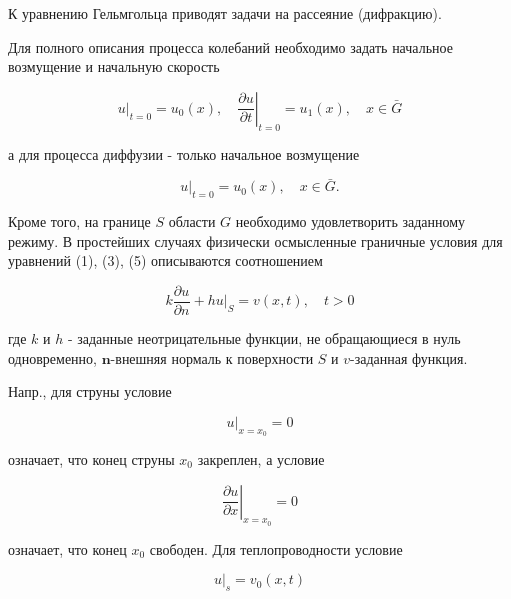 \documentclass[10pt]{article}
\begin{document}
К уравнению Гельмгольца приводят задачи на рассеяние (дифракцию).



Для полного описания процесса колебаний необходимо задать начальное возмущение и начальную скорость



\[

\left.u\right|_{t=0}=u_{0}(x),\left.\quad \frac{\partial u}{\partial t}\right|_{t=0}=u_{1}(x), \quad x \in \bar{G}

\]



а для процесса диффузии - только начальное возмущение



\[

\left.u\right|_{t=0}=u_{0}(x), \quad x \in \bar{G} .

\]



Кроме того, на границе $S$ области $G$ необходимо удовлетворить заданному режиму. В простейших случаях физически осмысленные граничные условия для уравнений (1), (3), (5) описываются соотношением



\[

k \frac{\partial u}{\partial n}+\left.h u\right|_{S}=v(x, t), \quad t>0

\]



где $k$ и $h$ - заданные неотрицательные функции, не обращающиеся в нуль одновременно, $\boldsymbol{n}$-внешняя нормаль к поверхности $S$ и $v$-заданная функция.



Напр., для струны условие



\[

\left.u\right|_{x=x_{0}}=0

\]



означает, что конец струны $x_{0}$ закреплен, а условие



\[

\left.\frac{\partial u}{\partial x}\right|_{x=x_{0}}=0

\]



означает, что конец $x_{0}$ свободен. Для теплопроводности условие



\[

\left.u\right|_{s}=v_{0}(x, t)

\]
\end{document}
